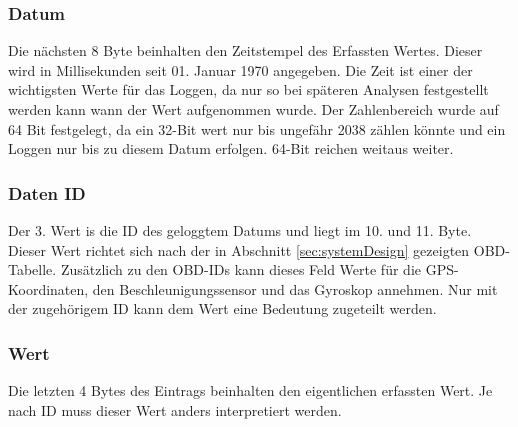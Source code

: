 \subsubsection*{Datum}
Die nächsten 8 Byte beinhalten den Zeitstempel des Erfassten Wertes. Dieser wird in Millisekunden seit 01. Januar 1970 angegeben. Die Zeit ist einer der wichtigsten Werte für das Loggen, da nur so bei späteren Analysen festgestellt werden kann wann der Wert aufgenommen wurde. Der Zahlenbereich wurde auf 64 Bit festgelegt, da ein 32-Bit wert nur bis ungefähr 2038 zählen könnte und ein Loggen nur bis zu diesem Datum erfolgen. 64-Bit reichen weitaus weiter.  
\subsubsection*{Daten ID}
Der 3. Wert is die ID des geloggtem Datums und liegt im 10. und 11. Byte. Dieser Wert richtet sich nach der in Abschnitt \ref{sec:systemDesign} gezeigten OBD-Tabelle. Zusätzlich zu den OBD-IDs kann dieses Feld Werte für die GPS-Koordinaten, den Beschleunigungssensor und das Gyroskop annehmen.  Nur mit der zugehörigem ID kann dem Wert eine Bedeutung zugeteilt werden. 
\subsubsection*{Wert}
Die letzten 4 Bytes des Eintrags beinhalten den eigentlichen erfassten Wert. Je nach ID muss dieser Wert anders interpretiert werden.
